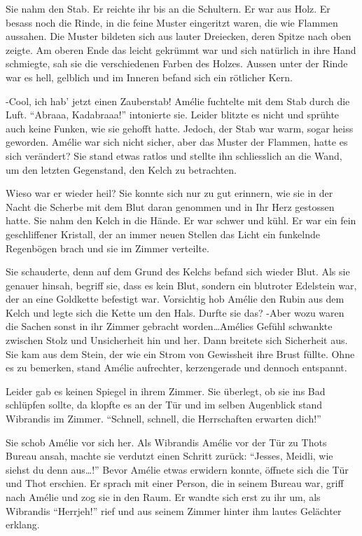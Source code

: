 \documentclass[11pt,titlepage,a5paper]{book}
\begin{document}
Sie nahm den Stab. Er reichte ihr bis an die Schultern. Er war aus Holz. Er besass noch die Rinde, in die feine Muster eingeritzt waren, die wie Flammen aussahen. Die Muster bildeten sich aus lauter Dreiecken, deren Spitze nach oben zeigte. Am oberen Ende das leicht gekrümmt war und sich natürlich in ihre Hand schmiegte, sah sie die verschiedenen Farben des Holzes. Aussen unter der Rinde war es hell, gelblich und im Inneren befand sich ein rötlicher Kern.

-Cool, ich hab' jetzt einen Zauberstab! Amélie fuchtelte mit dem Stab durch die Luft. "`Abraaa, Kadabraaa!"' intonierte sie. Leider blitzte es nicht und sprühte auch keine Funken, wie sie gehofft hatte. Jedoch, der Stab war warm, sogar heiss geworden. Amélie war sich nicht sicher, aber das Muster der Flammen, hatte es sich verändert? Sie stand etwas ratlos und stellte ihn schliesslich an die Wand, um den letzten Gegenstand, den Kelch zu betrachten.

Wieso war er wieder heil? Sie konnte sich nur zu gut erinnern, wie sie in der Nacht die Scherbe mit dem Blut daran genommen und in Ihr Herz gestossen hatte.  Sie nahm den Kelch in die Hände. Er war schwer und kühl. Er war ein fein geschliffener Kristall, der an immer neuen Stellen das Licht ein funkelnde Regenbögen brach und sie im Zimmer verteilte.

Sie schauderte, denn auf dem Grund des Kelchs befand sich wieder Blut. Als sie genauer hinsah, begriff sie, dass es kein Blut, sondern ein blutroter Edelstein war, der an eine Goldkette befestigt war. Vorsichtig hob Amélie den Rubin aus dem Kelch und legte sich die Kette um den Hals. Durfte sie das? -Aber wozu waren die Sachen sonst in ihr Zimmer gebracht worden\dots Amélies Gefühl schwankte zwischen Stolz und Unsicherheit hin und her. Dann breitete sich Sicherheit aus. Sie kam aus dem Stein, der wie ein Strom von Gewissheit ihre Brust füllte. Ohne es zu bemerken, stand Amélie aufrechter, kerzengerade und dennoch entspannt.

Leider gab es keinen Spiegel in ihrem Zimmer. Sie überlegt, ob sie ins Bad schlüpfen sollte, da klopfte es an der Tür und im selben Augenblick stand Wibrandis im Zimmer. "`Schnell, schnell, die Herrschaften erwarten dich!"' 

Sie schob Amélie vor sich her. Als Wibrandis Amélie vor der Tür zu Thots Bureau ansah, machte sie verdutzt einen Schritt zurück: "`Jesses, Meidli, wie siehst du denn aus\dots!"' Bevor Amélie etwas erwidern konnte, öffnete sich die Tür und Thot erschien. Er sprach mit einer Person, die in seinem Bureau war, griff nach Amélie und zog sie in den Raum. Er wandte sich erst zu ihr um, als Wibrandis "`Herrjeh!"' rief und aus seinem Zimmer hinter ihm lautes Gelächter erklang.
\end{document}
